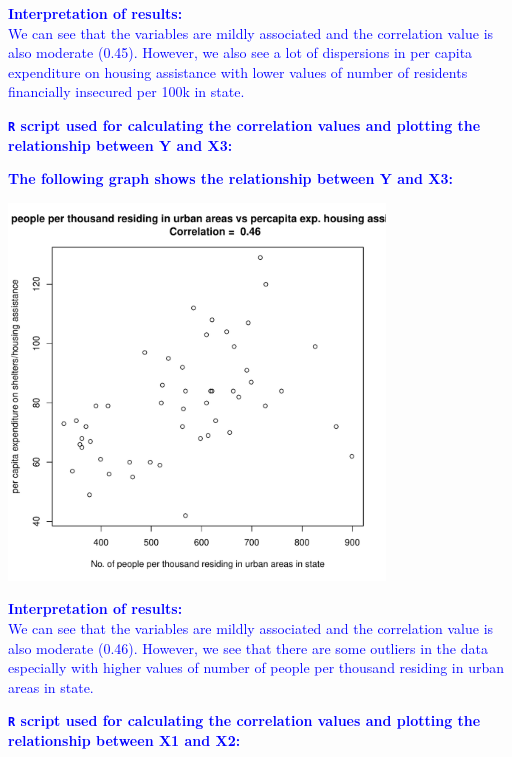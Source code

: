 \documentclass[12pt,letterpaper]{article}
\begin{document}
\begin{itemize}
\textcolor{blue}{
	\textbf{Interpretation of results:}\\
	We can see that the variables are mildly associated and the correlation value is also moderate (0.45). However, we also see a lot of dispersions in per capita expenditure on housing assistance with lower values of number of residents financially insecured per 100k in state. 
}

\pagebreak

\textcolor{blue}{
	\noindent \textbf{\texttt{R} script used for calculating the correlation values and plotting the relationship between Y and X3:}
}

  

\vspace{.25cm}

\textcolor{blue}{
	\noindent \textbf{The following graph shows the relationship between Y and X3:}
}
\begin{center}
	\includegraphics[width=10cm]{plot_Y_X3.pdf}  
\end{center}

\textcolor{blue}{
	\textbf{Interpretation of results:}\\
	We can see that the variables are mildly associated and the correlation value is also moderate (0.46). However, we see that there are some outliers in the data especially with higher values of number of people per thousand residing in urban areas in state.
}

\pagebreak

\textcolor{blue}{
	\noindent \textbf{\texttt{R} script used for calculating the correlation values and plotting the relationship between X1 and X2:}
}


\end{itemize}
\end{document}
